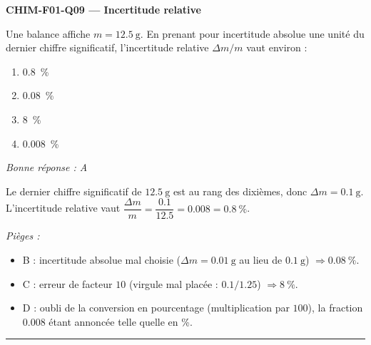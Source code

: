 \documentclass[11pt,a4paper]{article}
\begin{document}
\noindent\textbf{CHIM-F01-Q09 --- Incertitude relative}\par
Une balance affiche $m = \qty{12.5}{\gram}$. En prenant pour incertitude absolue une unité du dernier chiffre significatif, l'incertitude relative $\Delta m / m$ vaut environ :
\begin{enumerate}[label=\Alph*)]
\item \qty{0.8}{\percent}
\item \qty{0.08}{\percent}
\item \qty{8}{\percent}
\item \qty{0.008}{\percent}
\end{enumerate}
\textit{Bonne réponse : A}\par
Le dernier chiffre significatif de $\qty{12.5}{\gram}$ est au rang des dixièmes, donc $\Delta m = \qty{0.1}{\gram}$. L'incertitude relative vaut $\dfrac{\Delta m}{m} = \dfrac{\num{0.1}}{\num{12.5}} = \num{0.008} = \qty{0.8}{\percent}$.\par
\textit{Pièges :}
\begin{itemize}
\item B : incertitude absolue mal choisie ($\Delta m = \qty{0.01}{\gram}$ au lieu de $\qty{0.1}{\gram}$) $\Rightarrow \qty{0.08}{\percent}$.
\item C : erreur de facteur $10$ (virgule mal placée : $\num{0.1}/\num{1.25}$) $\Rightarrow \qty{8}{\percent}$.
\item D : oubli de la conversion en pourcentage (multiplication par $100$), la fraction $\num{0.008}$ étant annoncée telle quelle en \si{\percent}.
\end{itemize}
\vspace{6pt}\hrule\vspace{8pt}
\end{document}
